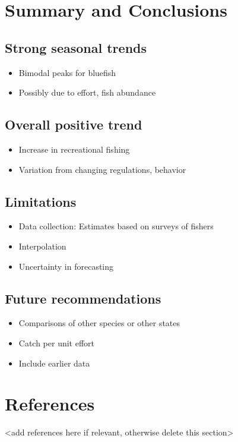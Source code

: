 \documentclass[
  12pt,
]{article}
\providecommand{\tightlist}{%
  \setlength{\itemsep}{0pt}\setlength{\parskip}{0pt}}
\begin{document}
\hypertarget{summary-and-conclusions}{%
\section{Summary and Conclusions}\label{summary-and-conclusions}}

\hypertarget{strong-seasonal-trends}{%
\subsection{Strong seasonal trends}\label{strong-seasonal-trends}}

\begin{itemize}
\tightlist
\item
  Bimodal peaks for bluefish
\item
  Possibly due to effort, fish abundance
\end{itemize}

\hypertarget{overall-positive-trend}{%
\subsection{Overall positive trend}\label{overall-positive-trend}}

\begin{itemize}
\tightlist
\item
  Increase in recreational fishing
\item
  Variation from changing regulations, behavior
\end{itemize}

\hypertarget{limitations}{%
\subsection{Limitations}\label{limitations}}

\begin{itemize}
\tightlist
\item
  Data collection: Estimates based on surveys of fishers
\item
  Interpolation
\item
  Uncertainty in forecasting
\end{itemize}

\hypertarget{future-recommendations}{%
\subsection{Future recommendations}\label{future-recommendations}}

\begin{itemize}
\tightlist
\item
  Comparisons of other species or other states
\item
  Catch per unit effort
\item
  Include earlier data
\end{itemize}

\newpage

\hypertarget{references}{%
\section{References}\label{references}}

\textless add references here if relevant, otherwise delete this
section\textgreater{}
\end{document}
